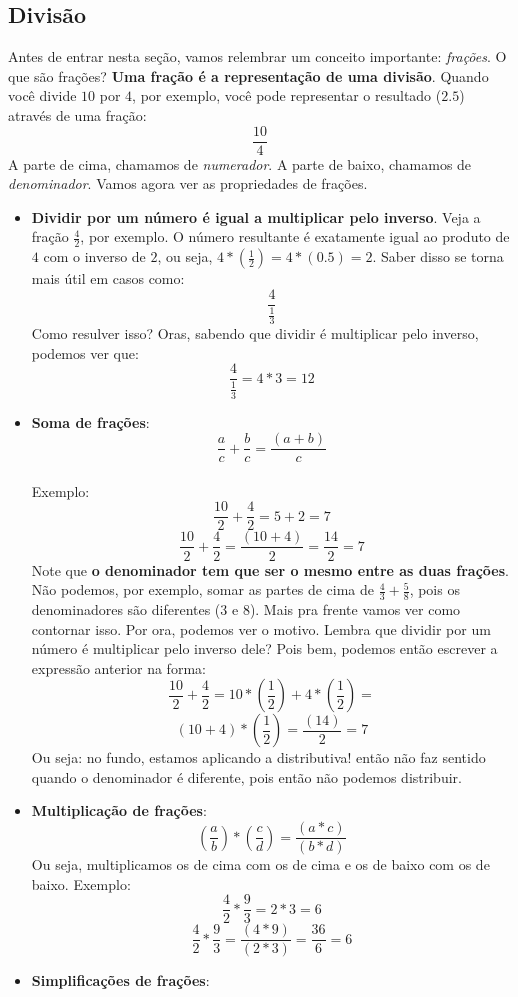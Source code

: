 \documentclass{article}
\begin{document}
\subsection{Divisão}
Antes de entrar nesta seção, vamos relembrar um conceito importante: 
\textit{frações}. O que são frações? \textbf{Uma fração é a representação de
uma divisão}. Quando você divide $10$ por $4$, por exemplo, você pode 
representar o resultado ($2.5$) através de uma fração:
$$\frac{10}{4}$$
A parte de cima, chamamos de \textit{numerador}. A parte de baixo, chamamos de
\textit{denominador}. Vamos agora ver as propriedades de frações.
\begin{itemize}
	\item \textbf{Dividir por um número é igual a multiplicar pelo inverso}.
	Veja a fração $\frac{4}{2}$, por exemplo. O número resultante é exatamente
	igual ao produto de $4$ com o inverso de $2$, ou seja,
	$4*(\frac{1}{2}) = 4*(0.5) = 2$. Saber disso se torna mais útil em
	casos como:
	$$\frac{4}{\frac{1}{3}}$$
	Como resulver isso? Oras, sabendo que dividir é multiplicar pelo inverso,
	podemos ver que:
	$$\frac{4}{\frac{1}{3}} = 4*3 = 12$$
	\item \textbf{Soma de frações}:
	$$\frac{a}{c} + \frac{b}{c} = \frac{(a + b)}{c}$$
	\paragraph{}
	Exemplo:
	$$\frac{10}{2} + \frac{4}{2} = 5 + 2 = 7$$
	$$\frac{10}{2} + \frac{4}{2} = \frac{(10 + 4)}{2} = \frac{14}{2} = 7$$
	Note que \textbf{o denominador tem que ser o mesmo entre as duas frações}.
	Não podemos, por exemplo, somar as partes de cima de $\frac{4}{3} + 
	\frac{5}{8}$, pois os denominadores são diferentes ($3$ e $8$). Mais pra 
	frente vamos ver como contornar isso. Por ora, podemos ver o motivo. Lembra
	que dividir por um número é multiplicar pelo inverso dele? Pois bem, podemos
	então escrever a expressão anterior na forma:
	$$\frac{10}{2} + \frac{4}{2} = 10*(\frac{1}{2}) + 4*(\frac{1}{2}) =$$
	$$(10 + 4)*(\frac{1}{2}) = \frac{(14)}{2} = 7$$
	Ou seja: no fundo, estamos aplicando a distributiva! então não faz sentido
	quando o denominador é diferente, pois então não podemos distribuir.
	\item \textbf{Multiplicação de frações}:
	$$(\frac{a}{b})*(\frac{c}{d}) = \frac{(a*c)}{(b*d)}$$
	Ou seja, multiplicamos os de cima com os de cima e os de baixo com os de
	baixo. Exemplo:
	$$\frac{4}{2} * \frac{9}{3} = 2 * 3 = 6$$
	$$\frac{4}{2} * \frac{9}{3} = \frac{(4*9)}{(2*3)} = \frac{36}{6} = 6$$
	\item \textbf{Simplificações de frações}:

\end{itemize}
\end{document}
